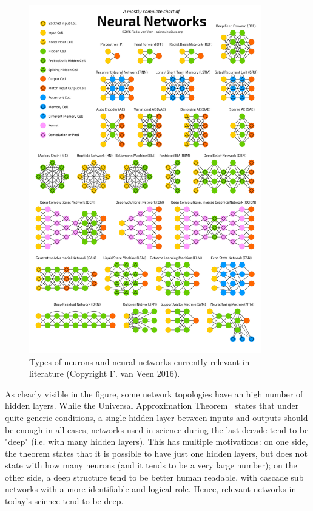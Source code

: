 \begin{figure}[h]
    \centering
    \includegraphics[width=0.9\textwidth]{images/types.png}
    \caption{Types of neurons and neural networks currently relevant in literature (Copyright F. van Veen 2016).}
    \label{fig:types}
\end{figure}

As clearly visible in the figure, some network topologies have an high number of hidden layers. While the Universal Approximation Theorem~\cite{nonlinearitytheorem} states that under quite generic conditions, a single hidden layer between inputs and outputs should be enough in all cases, networks used in science during the last decade tend to be "deep" (i.e. with many hidden layers). This has multiple motivations: on one side, the theorem states that it is possible to have just one hidden layers, but does not state with how many neurons (and it tends to be a very large number); on the other side, a deep structure tend to be better human readable, with cascade sub networks with a more identifiable and logical role. Hence, relevant networks in today's science tend to be deep.


